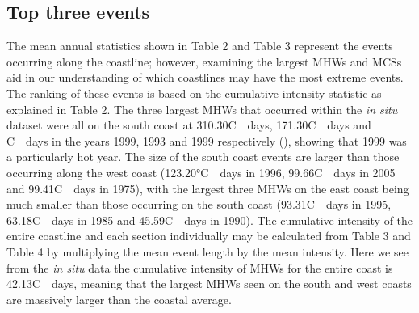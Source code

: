 \documentclass[a4paper,10pt,review]{elsarticle}
\begin{document}
\subsection{Top three events}
The mean annual statistics shown in Table 2 and Table 3 represent the events occurring along the coastline; however, examining the largest MHWs and MCSs aid in our understanding of which coastlines may have the most extreme events. The ranking of these events is based on the cumulative intensity statistic as explained in Table 2. The three largest MHWs that occurred within the \emph{in situ} dataset were all on the south coast at 310.30\degree C~\texttimes~days, 171.30\degree C~\texttimes~days and \degree C~\texttimes~days in the years 1999, 1993 and 1999 respectively (), showing that 1999 was a particularly hot year. The size of the south coast events are larger than those occurring along the west coast (123.20°\degree C~\texttimes~days in 1996, 99.66\degree C~\texttimes~days in 2005 and 99.41\degree C~\texttimes~days in 1975), with the largest three MHWs on the east coast being much smaller than those occurring on the south coast (93.31\degree C~\texttimes~days in 1995, 63.18\degree C~\texttimes~days in 1985 and 45.59\degree C~\texttimes~days in 1990). The cumulative intensity of the entire coastline and each section individually may be calculated from Table 3 and Table 4 by multiplying the mean event length by the mean intensity. Here we see from the \emph{in situ} data the cumulative intensity of MHWs for the entire coast is 42.13\degree C~\texttimes~days, meaning that the largest MHWs seen on the south and west coasts are massively larger than the coastal average.
\end{document}
